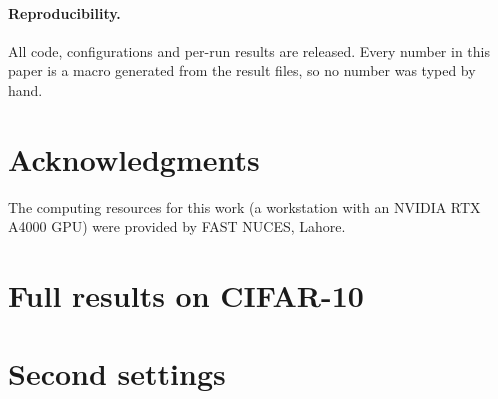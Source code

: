 \documentclass[10pt]{article}
\begin{document}
\paragraph{Reproducibility.} All code, configurations and per-run results are released. Every number in this paper is a
macro generated from the result files, so no number was typed by hand.

\section*{Acknowledgments}
The computing resources for this work (a workstation with an NVIDIA RTX A4000 GPU) were provided by FAST NUCES, Lahore.




\appendix

\section{Full results on CIFAR-10}
\label{app:full}

\begin{table}[h]
\centering
\caption{Empirical attacks on the vanilla CIFAR-10 zoo (\%): accuracy under the universal patch (5 and 8\,px) and 8\,px
target hit rate, accuracy with a random-noise 8\,px patch, LaVAN 5\,px robust accuracy, and LaVAN targeted hit rates. Mean
{\scriptsize$\pm$ std} over  seeds.}
\label{tab:attacks}
\small
\setlength{\tabcolsep}{3pt}

\end{table}

\begin{table}[h]
\centering
\caption{Transfer on CIFAR-10 (\%) between the full (F) and compressed (C) models: universal 8\,px target hit rate and LaVAN
5\,px untargeted transfer rate; ``noise'' is a random patch at the LaVAN locations.}
\label{tab:transfer}
\small

\end{table}

\begin{table}[h]
\centering
\caption{Paired differences on CIFAR-10 (pp), mean over seeds {\scriptsize[95\% $t$-interval]}; bold means that the
interval excludes zero. The certification columns refer to the defended zoo.}
\label{tab:diffs}
\small
\setlength{\tabcolsep}{3pt}

\end{table}

\section{Second settings}
\label{app:settings}
\end{document}
